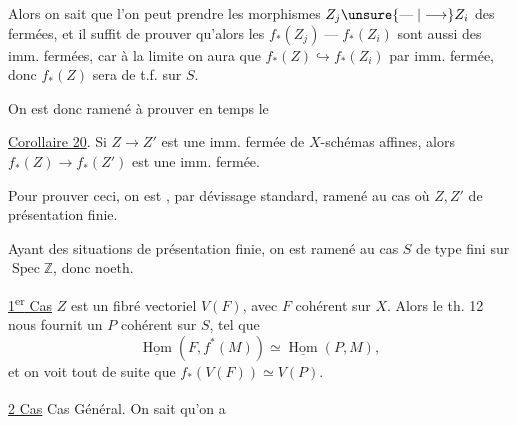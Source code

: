 Alors on sait que l'on peut prendre les morphismes  $Z_j\unsure{\mathrel{\text{---}}|\longrightarrow} Z_i$ des  fermées, et il suffit de prouver qu'alors les $f_*(Z_j)\mathrel{\text{---}} f_*(Z_i)$ sont aussi des imm. fermées, car à la limite on aura que $f_*(Z)\hookrightarrow f_*(Z_i)$ par imm. fermée, donc $f_*(Z)$ sera de t.f. sur $S$.

On est donc ramené à prouver en  temps le

\uline{Corollaire 20}. Si $Z\longrightarrow Z'$ est une imm. fermée de $X$-schémas affines, alors $f_*(Z)\longrightarrow f_*(Z')$ est une imm. fermée.

Pour prouver ceci, on est , par dévissage standard, ramené au cas où $Z,Z'$ de présentation finie.

Ayant des situations de présentation finie, on est ramené au cas $S$ de type fini sur $\operatorname{Spec}\mathbb Z$, donc noeth.

\uline{1\textsuperscript{er} Cas} $Z$ est un fibré vectoriel $V(F)$, avec $F$ cohérent sur $X$. Alors le th. 12 nous fournit un $P$ cohérent sur $S$, tel que
\[
 \underline{\operatorname{Hom}}(F,f^*(M))\simeq\underline{\operatorname{Hom}}(P,M),
\]
et on voit tout de suite que $f_*(V(F))\simeq V(P)$.

\uline{2\textsuperscript{} Cas} Cas Général. On sait qu'on a
